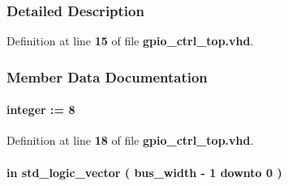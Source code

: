 \subsubsection{Detailed Description}


Definition at line {\bf 15} of file {\bf gpio\+\_\+ctrl\+\_\+top.\+vhd}.



\subsubsection{Member Data Documentation}
\paragraph[{bus\+\_\+width}]{ {\bfseries \textcolor{vhdlchar}{ }} {\bfseries \textcolor{comment}{integer}\textcolor{vhdlchar}{ }\textcolor{vhdlchar}{ }\textcolor{vhdlchar}{\+:}\textcolor{vhdlchar}{=}\textcolor{vhdlchar}{ }\textcolor{vhdlchar}{ } \textcolor{vhdldigit}{8} \textcolor{vhdlchar}{ }} \hspace{0.3cm}{\ttfamily [Generic]}}\label{classgpio__ctrl__top_a3ed1270581df223608d4ece72094c078}


Definition at line {\bf 18} of file {\bf gpio\+\_\+ctrl\+\_\+top.\+vhd}.

\paragraph[{dir\+\_\+0}]{ {\bfseries \textcolor{keywordflow}{in}\textcolor{vhdlchar}{ }} {\bfseries \textcolor{comment}{std\+\_\+logic\+\_\+vector}\textcolor{vhdlchar}{ }\textcolor{vhdlchar}{(}\textcolor{vhdlchar}{ }\textcolor{vhdlchar}{ }\textcolor{vhdlchar}{ }\textcolor{vhdlchar}{ }{\bfseries {\bf bus\+\_\+width}} \textcolor{vhdlchar}{-\/}\textcolor{vhdlchar}{ } \textcolor{vhdldigit}{1} \textcolor{vhdlchar}{ }\textcolor{keywordflow}{downto}\textcolor{vhdlchar}{ }\textcolor{vhdlchar}{ } \textcolor{vhdldigit}{0} \textcolor{vhdlchar}{ }\textcolor{vhdlchar}{)}\textcolor{vhdlchar}{ }} \hspace{0.3cm}{\ttfamily [Port]}}\label{classgpio__ctrl__top_ad0ca5c0dae19d7c102082147e0fb1b6b}


